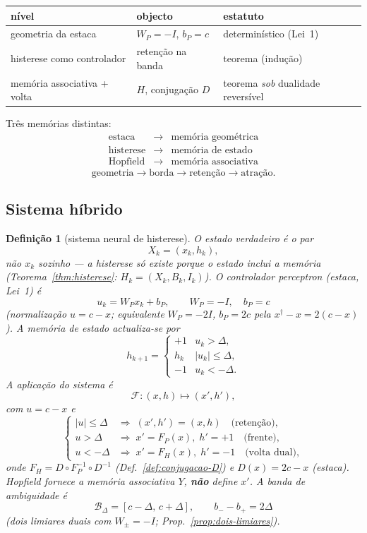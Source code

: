\documentclass[11pt,a4paper]{article}
\newtheorem{definicao}{Definição}
\begin{document}
\begin{center}\small
\begin{tabular}{@{}llp{5.8cm}@{}}
\toprule
nível & objecto & estatuto \\
\midrule
geometria da estaca & $W_P=-I$, $b_P=c$ & determinístico (Lei~1) \\
histerese como controlador & retenção na banda & teorema (indução) \\
memória associativa + volta & $H$, conjugação $D$ & teorema \emph{sob} dualidade reversível \\
\bottomrule
\end{tabular}
\end{center}
Três memórias distintas:
\[
\boxed{
\begin{array}{rcl}
\text{estaca} &\longrightarrow& \text{memória geométrica}\\
\text{histerese} &\longrightarrow& \text{memória de estado}\\
\text{Hopfield} &\longrightarrow& \text{memória associativa}
\end{array}
}
\]
\[
\boxed{
\text{geometria}\to\text{borda}\to\text{retenção}\to\text{atração}.
}
\]

\subsection*{Sistema híbrido}

\begin{definicao}[sistema neural de histerese]\label{def:sistema-hibrido}
O estado verdadeiro é o par
\[
\boxed{X_k=(x_k,h_k)},
\]
não $x_k$ sozinho --- a histerese só existe porque o estado inclui a
memória (Teorema~\ref{thm:histerese}: $H_k=(X_k,B_k,I_k)$).
O controlador perceptron (estaca, Lei~1) é
\[
\boxed{u_k=W_Px_k+b_P},\qquad
\boxed{W_P=-I,\quad b_P=c}
\]
(normalização $u=c-x$; equivalente $W_P=-2I$, $b_P=2c$ pela
$x^{\dagger}-x=2(c-x)$). A memória de estado actualiza-se por
\[
\boxed{
h_{k+1}
=
\begin{cases}
+1 & u_k>\Delta,\\
h_k & |u_k|\le\Delta,\\
-1 & u_k<-\Delta.
\end{cases}
}
\]
A aplicação do sistema é
\[
\boxed{\mathcal{F}\colon(x,h)\mapsto(x',h')},
\]
com $u=c-x$ e
\[
\boxed{
\begin{cases}
|u|\le\Delta & \Longrightarrow\; (x',h')=(x,h)
\quad\text{(retenção)},\\[4pt]
u>\Delta & \Longrightarrow\;
x'=F_P(x),\; h'=+1
\quad\text{(frente)},\\[4pt]
u<-\Delta & \Longrightarrow\;
x'=F_H(x),\; h'=-1
\quad\text{(volta dual)},
\end{cases}
}
\]
onde $F_H=D\circ F_P^{-1}\circ D^{-1}$
(Def.~\ref{def:conjugacao-D}) e $D(x)=2c-x$ (estaca).
Hopfield fornece a memória associativa $Y$, \textbf{não} define $x'$.
A banda de ambiguidade é
\[
\boxed{\mathcal{B}_{\Delta}=[c-\Delta,\,c+\Delta]},
\qquad
\boxed{b_{-}-b_{+}=2\Delta}
\]
(dois limiares duais com $W_{\pm}=-I$; Prop.~\ref{prop:dois-limiares}).
\end{definicao}
\end{document}
